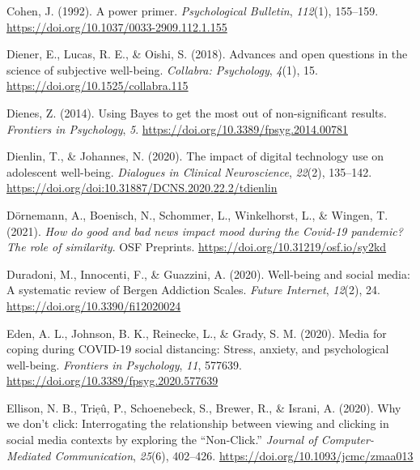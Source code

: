 \documentclass[
  man,mask]{apa6}
\newlength{\cslhangindent}
\newlength{\cslentryspacingunit} %
\newenvironment{CSLReferences}[2] %
 {%
  \setlength{\parindent}{0pt}
  \ifodd #1
  \let\oldpar\par
  \def\par{\hangindent=\cslhangindent\oldpar}
  \fi
  \setlength{\parskip}{#2\cslentryspacingunit}
 }%
 {}
\begin{document}
\begin{CSLReferences}{1}{0}
\leavevmode{}%
Cohen, J. (1992). A power primer. \emph{Psychological Bulletin}, \emph{112}(1), 155--159. \url{https://doi.org/10.1037/0033-2909.112.1.155}

\leavevmode{}%
Diener, E., Lucas, R. E., \& Oishi, S. (2018). Advances and open questions in the science of subjective well-being. \emph{Collabra: Psychology}, \emph{4}(1), 15. \url{https://doi.org/10.1525/collabra.115}

\leavevmode{}%
Dienes, Z. (2014). Using {Bayes} to get the most out of non-significant results. \emph{Frontiers in Psychology}, \emph{5}. \url{https://doi.org/10.3389/fpsyg.2014.00781}

\leavevmode{}%
Dienlin, T., \& Johannes, N. (2020). The impact of digital technology use on adolescent well-being. \emph{Dialogues in Clinical Neuroscience}, \emph{22}(2), 135--142. \url{https://doi.org/doi:10.31887/DCNS.2020.22.2/tdienlin}

\leavevmode{}%
Dörnemann, A., Boenisch, N., Schommer, L., Winkelhorst, L., \& Wingen, T. (2021). \emph{How do good and bad news impact mood during the {Covid-19} pandemic? {The} role of similarity}. {OSF Preprints}. \url{https://doi.org/10.31219/osf.io/sy2kd}

\leavevmode{}%
Duradoni, M., Innocenti, F., \& Guazzini, A. (2020). Well-being and social media: {A} systematic review of {Bergen Addiction Scales}. \emph{Future Internet}, \emph{12}(2), 24. \url{https://doi.org/10.3390/fi12020024}

\leavevmode{}%
Eden, A. L., Johnson, B. K., Reinecke, L., \& Grady, S. M. (2020). Media for coping during {COVID-19} social distancing: {Stress}, anxiety, and psychological well-being. \emph{Frontiers in Psychology}, \emph{11}, 577639. \url{https://doi.org/10.3389/fpsyg.2020.577639}

\leavevmode{}%
Ellison, N. B., Triẹû, P., Schoenebeck, S., Brewer, R., \& Israni, A. (2020). Why we don't click: {Interrogating} the relationship between viewing and clicking in social media contexts by exploring the {``{Non-Click}.''} \emph{Journal of Computer-Mediated Communication}, \emph{25}(6), 402--426. \url{https://doi.org/10.1093/jcmc/zmaa013}


\end{CSLReferences}
\end{document}
